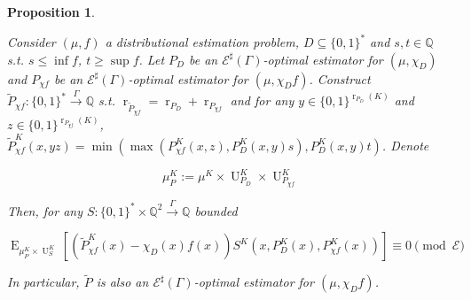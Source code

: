 \documentclass{article}
\numberwithin{equation}{section}
\theoremstyle{definition}
\theoremstyle{plain}
\newtheorem{proposition}{Proposition}[section]
\newcommand{\Bool}{\{0,1\}}
\newcommand{\Words}{{\Bool^*}}
\DeclareMathOperator{\E}{E}
\DeclareMathOperator{\R}{r}
\DeclareMathOperator{\Un}{U}
\newcommand{\Rats}{\mathbb{Q}}
\newcommand{\Fall}{\mathcal{E}}
\newcommand{\ESG}{\Fall^\sharp(\Gamma)}
\newcommand{\BoolR}[1]{\Bool^{\R_{#1}(K)}}
\newcommand{\Scheme}{\xrightarrow{\Gamma}}
\begin{document}
\begin{samepage}
\begin{proposition}
\label{prp:thm__cond__lemma}

Consider $(\mu, f)$ a distributional estimation problem, ${D \subseteq \Words}$ and $s, t \in \Rats$ s.t. ${s \leq \inf f}$, $t \geq \sup f$. Let $P_D$ be an $\ESG$-optimal estimator for $(\mu, \chi_D)$ and $P_{\chi f}$ be an $\ESG$-optimal estimator for $(\mu, \chi_D f)$. Construct $\tilde{P}_{\chi f}: \Words \Scheme \Rats$ s.t. $\R_{\tilde{P}_{\chi f}} = \R_{P_D} + \R_{P_{\chi f}}$ and for any ${y \in \BoolR{P_D}}$ and $z \in \BoolR{P_{\chi f}}$, ${\tilde{P}_{\chi f}^K(x,yz)=\min(\max(P_{\chi f}^K(x,z),P_D^K(x,y) s),P_D^K(x,y) t)}$. Denote 

\[\mu_P^K:=\mu^{K} \times \Un_{P_D}^K \times \Un_{P_{\chi f}}^K\] 

Then, for any $S: \Words \times \Rats^2 \Scheme \Rats$ bounded

\begin{equation}
\E_{\mu_P^K \times \Un_S^K}[(\tilde{P}_{\chi f}^K(x)-\chi_D(x)f(x))S^K(x,P_D^K(x),P_{\chi f}^K(x))]  \equiv 0 \pmod \Fall
\end{equation}

In particular, $\tilde{P}$ is also an $\ESG$-optimal estimator for $(\mu, \chi_D f)$.

\end{proposition}
\end{samepage}
\end{document}
